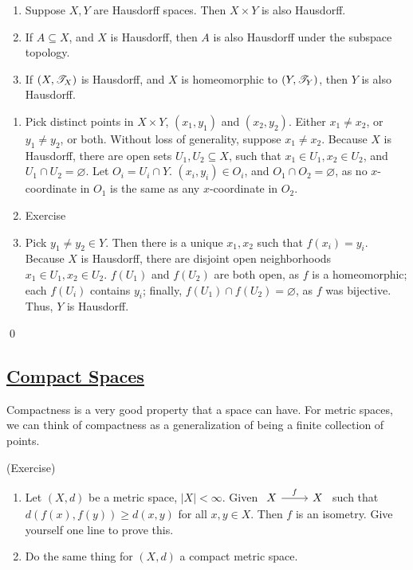 \documentclass[x11names,reqno,14pt]{extarticle}
\newcommand*{\oo}{{\infty}}
\begin{document}
\thm

\begin{enumerate}[label = (\alph*)]
\item Suppose $X, Y$ are Hausdorff spaces. Then $X\times Y$ is also Hausdorff. 
\item If $A \subseteq X$, and $X$ is Hausdorff, then $A$ is also Hausdorff under the subspace topology. 
\item If $(X, \mathscr{T}_X)$ is Hausdorff, and $X$ is homeomorphic to $(Y, \mathscr{T}_Y)$, then $Y$ is also Hausdorff. 
\end{enumerate}

\proof

\begin{enumerate}[label=(\alph*)]
\item Pick distinct points in $X \times Y$, $(x_1, y_1)$ and $(x_2, y_2)$. Either $x_1 \neq x_2$, or $y_1 \neq y_2$, or both. Without loss of generality, suppose $x_1 \neq x_2$. Because $X$ is Hausdorff, there are open sets $U_1, U_2 \subseteq X$, such that $x_1 \in U_1, x_2 \in U_2$, and $U_1 \cap U_2 = \varnothing$. Let $O_i = U_i \cap Y$. $(x_i, y_i) \in O_i$, and $O_1 \cap O_2 = \varnothing$, as no $x$-coordinate in $O_1$ is the same as any $x$-coordinate in $O_2$. 
\item Exercise
\item Pick $y_1 \neq y_2 \in Y$. Then there is a unique $x_1, x_2$ such that $f(x_i) = y_i$. Because $X$ is Hausdorff, there are disjoint open neighborhoods $x_1 \in U_1, x_2 \in U_2$. $f(U_1)$ and $f(U_2)$ are both open, as $f$ is a homeomorphic; each $f(U_i)$ contains $y_i$; finally, $f(U_1) \cap f(U_2) = \varnothing$, as $f$ was bijective. Thus, $Y$ is Hausdorff. 
\end{enumerate}

\qed

\subsection*{\underline{Compact Spaces}}

Compactness is a very good property that a space can have. For metric spaces, we can think of compactness as a generalization of being a finite collection of points. 

\exm (Exercise)

\begin{enumerate}[label=(\alph*)]
\item Let $(X, d)$ be a metric space, $|X|<\oo$. Given $\begin{tikzcd} X \ar[r, "f"] & X \end{tikzcd}$ such that $d(f(x), f(y)) \geq d(x, y)$ for all $x, y \in X$. Then $f$ is an isometry. Give yourself one line to prove this. 
\item Do the same thing for $(X, d)$ a compact metric space. 
\end{enumerate}
\end{document}
